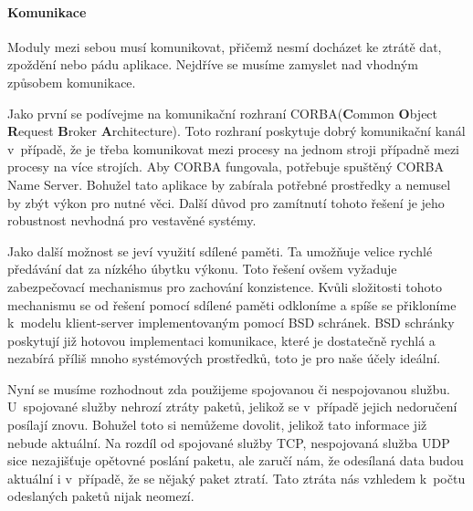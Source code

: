 		\paragraph{Komunikace}
		Moduly mezi sebou musí komunikovat, přičemž nesmí docházet ke ztrátě dat, zpoždění nebo pádu aplikace. Nejdříve se musíme zamyslet nad vhodným způsobem komunikace.\par 
		Jako první se podívejme na komunikační rozhraní CORBA(\textbf{C}ommon \textbf{O}bject \textbf{R}equest \textbf{B}roker \textbf{A}rchitecture). Toto rozhraní poskytuje dobrý komunikační kanál v~případě, že je třeba komunikovat mezi procesy na jednom stroji případně mezi procesy na více strojích. Aby CORBA fungovala, potřebuje spuštěný CORBA Name Server. Bohužel tato aplikace by zabírala potřebné prostředky a nemusel by zbýt výkon pro nutné věci. Další důvod pro zamítnutí tohoto řešení je jeho robustnost nevhodná pro vestavěné systémy.\par
		Jako další možnost se jeví využití sdílené paměti. Ta umožňuje velice rychlé předávání dat za nízkého úbytku výkonu. Toto řešení ovšem vyžaduje zabezpečovací mechanismus pro zachování konzistence. Kvůli složitosti tohoto mechanismu se od řešení pomocí sdílené paměti odkloníme a spíše se přikloníme k~modelu klient-server implementovaným pomocí BSD schránek. BSD schránky poskytují již hotovou implementaci komunikace, které je dostatečně rychlá a nezabírá příliš mnoho systémových prostředků, toto je pro naše účely ideální.\par
		Nyní se musíme rozhodnout zda použijeme spojovanou či nespojovanou službu. U~spojované služby nehrozí ztráty paketů, jelikož se v~případě jejich nedoručení posílají znovu. Bohužel toto si nemůžeme dovolit, jelikož tato informace již nebude aktuální. Na rozdíl od spojované služby TCP, nespojovaná služba UDP sice nezajišťuje opětovné poslání paketu, ale zaručí nám, že odesílaná data budou aktuální i v~případě, že se nějaký paket ztratí. Tato ztráta nás vzhledem k~počtu odeslaných paketů nijak neomezí. 


